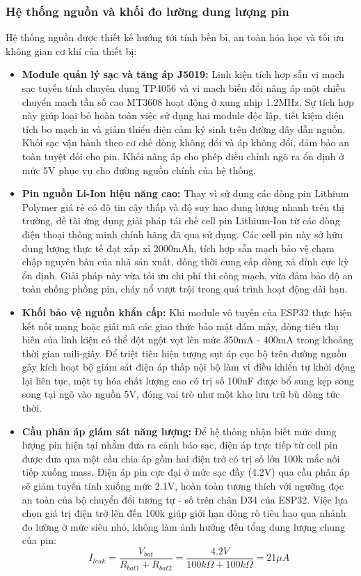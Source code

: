 \documentclass[12pt, a4paper, oneside]{article}
\begin{document}
\subsubsection{Hệ thống nguồn và khối đo lường dung lượng pin}
Hệ thống nguồn được thiết kế hướng tới tính bền bỉ, an toàn hóa học và tối ưu không gian cơ khí của thiết bị:
\begin{itemize}
    \item \textbf{Module quản lý sạc và tăng áp J5019:} Linh kiện tích hợp sẵn vi mạch sạc tuyến tính chuyên dụng TP4056 và vi mạch biến đổi nâng áp một chiều chuyển mạch tần số cao MT3608 hoạt động ở xung nhịp 1.2MHz. Sự tích hợp này giúp loại bỏ hoàn toàn việc sử dụng hai module độc lập, tiết kiệm diện tích bo mạch in và giảm thiểu điện cảm ký sinh trên đường dây dẫn nguồn. Khối sạc vận hành theo cơ chế dòng không đổi và áp không đổi, đảm bảo an toàn tuyệt đối cho pin. Khối nâng áp cho phép điều chỉnh ngõ ra ổn định ở mức 5V phục vụ cho đường nguồn chính của hệ thống.
    \item \textbf{Pin nguồn Li-Ion hiệu năng cao:} Thay vì sử dụng các dòng pin Lithium Polymer giá rẻ có độ tin cậy thấp và độ suy hao dung lượng nhanh trên thị trường, đề tài ứng dụng giải pháp tái chế cell pin Lithium-Ion từ các dòng điện thoại thông minh chính hãng đã qua sử dụng. Các cell pin này sở hữu dung lượng thực tế đạt xấp xỉ 2000mAh, tích hợp sẵn mạch bảo vệ chạm chập nguyên bản của nhà sản xuất, đồng thời cung cấp dòng xả đỉnh cực kỳ ổn định. Giải pháp này vừa tối ưu chi phí thi công mạch, vừa đảm bảo độ an toàn chống phồng pin, cháy nổ vượt trội trong quá trình hoạt động dài hạn.
    \item \textbf{Khối bảo vệ nguồn khẩn cấp:} Khi module vô tuyến của ESP32 thực hiện kết nối mạng hoặc giải mã các giao thức bảo mật đám mây, dòng tiêu thụ biên của linh kiện có thể đột ngột vọt lên mức 350mA - 400mA trong khoảng thời gian mili-giây. Để triệt tiêu hiện tượng sụt áp cục bộ trên đường nguồn gây kích hoạt bộ giám sát điện áp thấp nội bộ làm vi điều khiển tự khởi động lại liên tục, một tụ hóa chất lượng cao có trị số 100uF được bổ sung kẹp song song tại ngõ vào nguồn 5V, đóng vai trò như một kho lưu trữ bù dòng tức thời.
    \item \textbf{Cầu phân áp giám sát năng lượng:} Để hệ thống nhận biết mức dung lượng pin hiện tại nhằm đưa ra cảnh báo sạc, điện áp trực tiếp từ cell pin được đưa qua một cầu chia áp gồm hai điện trở có trị số lớn 100k mắc nối tiếp xuống mass. Điện áp pin cực đại ở mức sạc đầy (4.2V) qua cầu phân áp sẽ giảm tuyến tính xuống mức 2.1V, hoàn toàn tương thích với ngưỡng đọc an toàn của bộ chuyển đổi tương tự - số trên chân D34 của ESP32. Việc lựa chọn giá trị điện trở lên đến 100k giúp giới hạn dòng rò tiêu hao qua nhánh đo lường ở mức siêu nhỏ, không làm ảnh hưởng đến tổng dung lượng chung của pin:
    \begin{equation}
        I_{leak} = \frac{V_{bat}}{R_{bat1} + R_{bat2}} = \frac{4.2V}{100k\Omega + 100k\Omega} = 21\mu A
    \end{equation}
\end{itemize}
\end{document}
